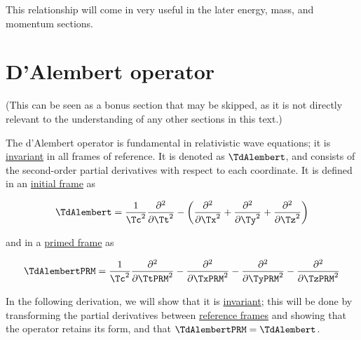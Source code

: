 This relationship will come in very useful in the later energy, mass, and momentum sections.

\section{D'Alembert operator}\label{sect: D'Alembert operator}

\begin{note}
	(This can be seen as a bonus section that may be skipped, as it is not directly relevant to the understanding of any other sections in this text.)
\end{note}

The d'Alembert operator is fundamental in relativistic wave equations; it is \hyperlink{def-lorentz-invariant}{invariant} in all frames of reference.
It is denoted as $\TdAlembert $, and consists of the second-order partial derivatives with respect to each coordinate.
It is defined in an \hyperlink{def-initial-Frame}{initial frame} as

\begin{equation}
	\label{eq: d Alembert operator}
	\TdAlembert  = \frac{1}{\Tc ^2}\frac{\partial^2}{\partial \Tt ^2} - \left(\frac{\partial^2}{\partial \Tx ^2} + \frac{\partial^2}{\partial \Ty ^2} + \frac{\partial^2}{\partial \Tz ^2}\right)
\end{equation}

and in a \hyperlink{def-Primed-Frame}{primed frame} as

\begin{equation}
	\TdAlembertPRM  = \frac{1}{\Tc ^2} \frac{\partial^2}{\partial \TtPRM ^2} - \frac{\partial^2}{\partial \TxPRM ^2} - \frac{\partial^2}{\partial \TyPRM ^2} - \frac{\partial^2}{\partial \TzPRM ^2}
\end{equation}

In the following derivation, we will show that it is \hyperlink{def-lorentz-invariant}{invariant}; this will be done by transforming the partial derivatives between \hyperlink{def-Reference-frame}{reference frames} and showing that the operator retains its form, and that $\TdAlembertPRM =\TdAlembert $.



